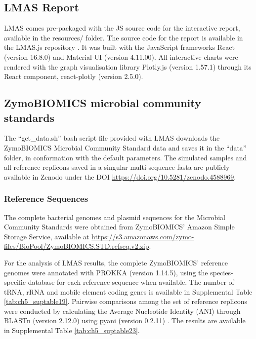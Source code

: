 \subsection{LMAS Report}

LMAS comes pre-packaged with the JS source code for the interactive report, available in the resources/ folder. The source code for the report is available in the LMAS.js repository \cite{noauthor_lmas_2021}. It was built with the JavaScript frameworks React \cite{noauthor_react_nodate} (version 16.8.0) and Material-UI \cite{noauthor_mui_nodate} (version 4.11.00). All interactive charts were rendered with the graph visualisation library Plotly.js \cite{noauthor_plotly_nodate} (version 1.57.1) through its React component, react-plotly \cite{noauthor_react_nodate}(version 2.5.0).

\subsection{ZymoBIOMICS microbial community standards} \label{ch5_sup_zymobiomics}

The “get\_data.sh” bash script file provided with LMAS downloads the ZymoBIOMICS Microbial Community Standard data and saves it in the “data” folder, in conformation with the default parameters. The simulated samples and all reference replicons saved in a singular multi-sequence fasta are publicly available in Zenodo under the DOI \url{https://doi.org/10.5281/zenodo.4588969}. 

\subsubsection{Reference Sequences}

The complete bacterial genomes and plasmid sequences for the Microbial Community Standards were obtained from ZymoBIOMICS’ Amazon Simple Storage Service, available at \url{https://s3.amazonaws.com/zymo-files/BioPool/ZymoBIOMICS.STD.refseq.v2.zip}.

For the analysis of LMAS results, the complete ZymoBIOMICS’ reference genomes were annotated with PROKKA \cite{seemann_prokka_2014} (version 1.14.5), using the species-specific database for each reference sequence when available. The number of tRNA, rRNA and mobile element coding genes is available in Supplemental Table \ref{tab:ch5_suptable19}. Pairwise comparisons among the set of reference replicons were conducted by calculating the Average Nucleotide Identity (ANI)  through BLASTn (version 2.12.0) \cite{camacho_blast_2009} using pyani \cite{pritchard_pyani_2022} (version 0.2.11) \cite{pritchard_genomics_2016}. The results are available in Supplemental Table \ref{tab:ch5_suptable23}. 

